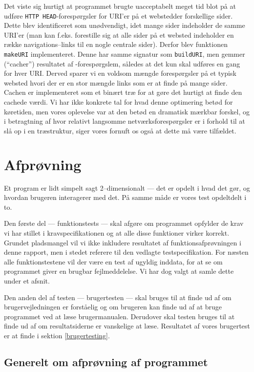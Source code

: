 \documentclass[a4paper,oneside]{memoir}
\begin{document}
Det viste sig hurtigt at programmet brugte uacceptabelt meget tid blot
på at udføre \texttt{HTTP HEAD}-forespørgsler for URI'er på et
webstedder forskellige sider. Dette blev identificeret som unødvendigt,
idet mange sider indeholder de samme URI'er (man kan f.eks. forestille
sig at alle sider på et websted indeholder en række navigations--links
til en nogle centrale sider). Derfor blev funktionen \texttt{makeURI}
implementeret. Denne har samme signatur som \texttt{buildURI}, men
gemmer (``cacher'') resultatet af -forespørgslem,
således at det kun skal udføres en gang for hver URI. Derved sparer vi
en voldsom mængde forespørgsler på et typisk websted hvori der er en
stor mængde links som er at finde på mange sider. Cachen er
implementeret som et binært træ for at gøre det hurtigt at finde den
cachede værdi. Vi har ikke konkrete tal for hvad denne optimering
betød for køretiden, men vores oplevelse var at den betød en dramatisk
mærkbar forskel, og i betragtning af hvor relativt langsomme
netværksforespørgsler er i forhold til at slå op i en træstruktur,
siger vores fornuft os også at dette må være tilfældet.

\chapter{Afprøvning}

Et program er lidt simpelt sagt 2--dimensionalt --- det er opdelt i
hvad det gør, og hvordan brugeren interagerer med det. På samme måde
er vores test opdeltdelt i to. 

Den første del --- funktionstests --- skal afgøre om programmet
opfylder de krav vi har stillet i kravspecifikationen og at alle disse
funktioner virker korrekt. Grundet pladsmangel vil vi ikke inkludere
resultatet af funktionsafprøvningen i denne rapport, men i stedet
referere til den vedlagte testspecifikation. For næsten alle
funktionstestene vil der være en test af ugyldig inddata, for at se om
programmet giver en brugbar fejlmeddelelse. Vi har dog valgt at samle
dette under et afsnit. 

Den anden del af testen --- brugertesten --- skal bruges til at finde
ud af om brugervejledningen er forståelig og om brugeren kan finde ud
af at bruge programmet ved at læse brugermanualen. Derudover skal
testen bruges til at finde ud af om resultatsiderne er vanskelige at
læse. Resultatet af vores brugertest er at finde i sektion
\ref{brugertesting}.

\section{Generelt om afprøvning af programmet}
\end{document}
